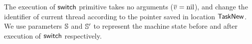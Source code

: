 The execution of $\mathsf{switch}{}$ primitive takes no arguments 
($\overline{v} = \text{nil}$), and change the identifier 
of current thread according to the pointer saved 
in location $\mathsf{TaskNew}$. We use parameters $\mathbb{S}$ 
and $\mathbb{S}'$ to represent the machine state before 
and after execution of $\mathsf{switch}{}$ respectively. 

